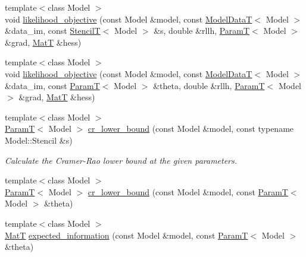 \begin{DoxyCompactItemize}
\item 
{\footnotesize template$<$class Model $>$ }\\void \hyperlink{namespacemappel_1_1methods_a82eaea0b938b0daff819da153e1351e2}{likelihood\+\_\+objective} (const Model \&model, const \hyperlink{namespacemappel_a97f050df953605381ae9c901c3b125f1}{Model\+DataT}$<$ Model $>$ \&data\+\_\+im, const \hyperlink{namespacemappel_a3a06598240007876f8c4bf834ad86197}{StencilT}$<$ Model $>$ \&s, double \&rllh, \hyperlink{namespacemappel_a667925cb0d6c0e49f2f035cc5a9a6857}{ParamT}$<$ Model $>$ \&grad, \hyperlink{namespacemappel_a7091ab87c528041f7e2027195fad8915}{MatT} \&hess)
\item 
{\footnotesize template$<$class Model $>$ }\\void \hyperlink{namespacemappel_1_1methods_a496d45e1db23f89b54ae0bef016a19b0}{likelihood\+\_\+objective} (const Model \&model, const \hyperlink{namespacemappel_a97f050df953605381ae9c901c3b125f1}{Model\+DataT}$<$ Model $>$ \&data\+\_\+im, const \hyperlink{namespacemappel_a667925cb0d6c0e49f2f035cc5a9a6857}{ParamT}$<$ Model $>$ \&theta, double \&rllh, \hyperlink{namespacemappel_a667925cb0d6c0e49f2f035cc5a9a6857}{ParamT}$<$ Model $>$ \&grad, \hyperlink{namespacemappel_a7091ab87c528041f7e2027195fad8915}{MatT} \&hess)
\item 
{\footnotesize template$<$class Model $>$ }\\\hyperlink{namespacemappel_a667925cb0d6c0e49f2f035cc5a9a6857}{ParamT}$<$ Model $>$ \hyperlink{namespacemappel_1_1methods_ac1fe2927bc882d9a76138010f41df115}{cr\+\_\+lower\+\_\+bound} (const Model \&model, const typename Model\+::\+Stencil \&s)
\begin{DoxyCompactList}\small\item\em Calculate the Cramer-\/\+Rao lower bound at the given parameters. \end{DoxyCompactList}\item 
{\footnotesize template$<$class Model $>$ }\\\hyperlink{namespacemappel_a667925cb0d6c0e49f2f035cc5a9a6857}{ParamT}$<$ Model $>$ \hyperlink{namespacemappel_1_1methods_a30d0f08f37d8f412a2677280cb39c588}{cr\+\_\+lower\+\_\+bound} (const Model \&model, const \hyperlink{namespacemappel_a667925cb0d6c0e49f2f035cc5a9a6857}{ParamT}$<$ Model $>$ \&theta)
\item 
{\footnotesize template$<$class Model $>$ }\\\hyperlink{namespacemappel_a7091ab87c528041f7e2027195fad8915}{MatT} \hyperlink{namespacemappel_1_1methods_a6632adc36d8b32fd8d198669e268c767}{expected\+\_\+information} (const Model \&model, const \hyperlink{namespacemappel_a667925cb0d6c0e49f2f035cc5a9a6857}{ParamT}$<$ Model $>$ \&theta)

\end{DoxyCompactItemize}
